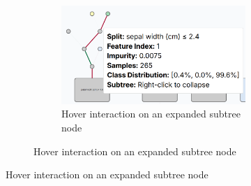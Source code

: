 \begin{figure}[ht!]
    \centering
    \begin{subfigure}[c]{0.28\textwidth}
        \centering
        \begin{subfigure}[c]{\linewidth}
            \centering
            \includegraphics[width=\linewidth]{images/spawnDecisionTreeExpandedHover.png}
            \caption{Hover interaction on an expanded subtree node}
            \label{fig:spawnExpandedHover}
        \end{subfigure}
        \vspace{0.3cm}
        

\end{subfigure}
\end{figure}

